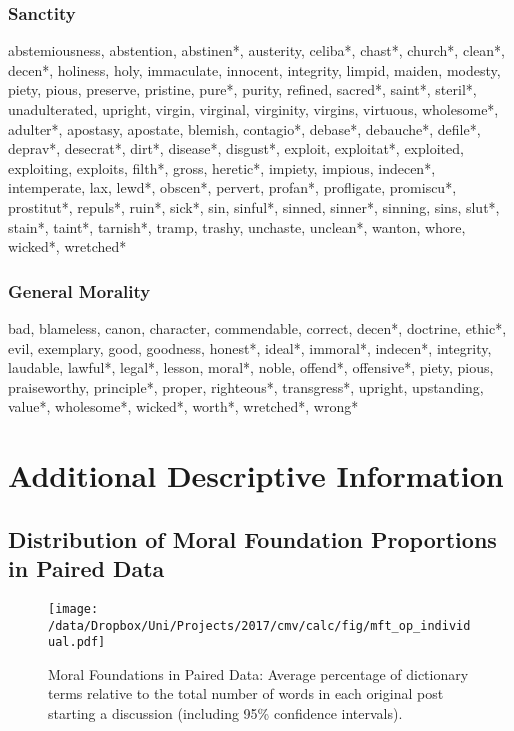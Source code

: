 \subsubsection*{Sanctity} abstemiousness, abstention, abstinen*, austerity, celiba*, chast*, church*, clean*, decen*, holiness, holy, immaculate, innocent, integrity, limpid, maiden, modesty, piety, pious, preserve, pristine, pure*, purity, refined, sacred*, saint*, steril*, unadulterated, upright, virgin, virginal, virginity, virgins, virtuous, wholesome*, adulter*, apostasy, apostate, blemish, contagio*, debase*, debauche*, defile*, deprav*, desecrat*, dirt*, disease*, disgust*, exploit, exploitat*, exploited, exploiting, exploits, filth*, gross, heretic*, impiety, impious, indecen*, intemperate, lax, lewd*, obscen*, pervert, profan*, profligate, promiscu*, prostitut*, repuls*, ruin*, sick*, sin, sinful*, sinned, sinner*, sinning, sins, slut*, stain*, taint*, tarnish*, tramp, trashy, unchaste, unclean*, wanton, whore, wicked*, wretched*

\subsubsection*{General Morality} bad, blameless, canon, character, commendable, correct, decen*, doctrine, ethic*, evil, exemplary, good, goodness, honest*, ideal*, immoral*, indecen*, integrity, laudable, lawful*, legal*, lesson, moral*, noble, offend*, offensive*, piety, pious, praiseworthy, principle*, proper, righteous*, transgress*, upright, upstanding, value*, wholesome*, wicked*, worth*, wretched*, wrong*

\section{Additional Descriptive Information}
\renewcommand\thefigure{A.\arabic{figure}}
\renewcommand\thetable{A.\arabic{table}}
\setcounter{figure}{0}
\setcounter{table}{0}



\subsection{Distribution of Moral Foundation Proportions in Paired Data}

\begin{figure}[h]
\centering
\texttt{[image: /data/Dropbox/Uni/Projects/2017/cmv/calc/fig/mft\_op\_individual.pdf]}
\caption[Moral Foundations in Paired Data]{Moral Foundations in Paired Data: Average percentage of dictionary terms relative to the total number of words in each original post starting a discussion (including 95\% confidence intervals).}
\end{figure}


